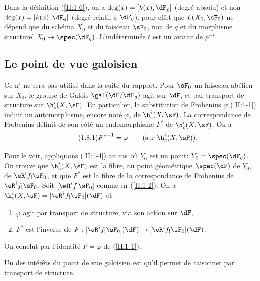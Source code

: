 Dans la définition (\ref{II:1-6}), on a $\deg(x)=[k(x),\dF_p]$ (degré 
absolu) et non $\deg(x)=[k(x),\dF_q]$ (degré relatif à $\dF_q$).  
pour effet que $L(X_0,\sF_0)$ ne dépend que du schéma $X_0$ et du faisceau 
$\sF_0$, non de $q$ et du morphisme structurel $X_0\to\spec(\dF_q)$. 
L'indéterminée $t$ est un avatar de $p^{-s}$. 





\subsection{Le point de vue galoisien}\label{II:1-8}

Ce n$^\circ$ ne sera pas utilisé dans la suite du rapport. Pour $\sF_0$ un 
faisceau abélien sur $X_0$, le groupe de Galois $\gal(\dF/\dF_q)$ agit sur 
$\dF$, et par transport de structure sur $\h_c^i(X,\sF)$. En particulier, la 
substitution de Frobenius $\varphi$ (\ref{II:1-1}) induit un automorphisme, 
encore noté $\varphi$, de $\h_c^i(X,\sF)$. La correspondance de Frobenius 
définit de son côté un endomorphisme $F^*$ de $\h_c^i(X,\sF)$. On a 
\begin{equation*}\tag{1.8.1}\label{II:eq:1-8-1}
  {F^*}^{-1} = \varphi \qquad \text{(sur $\h_c^i(X,\sF)$).}
\end{equation*}

Pour le voir, appliquons (\ref{II:1-4}) au cas où $Y_0$ est un point: 
$Y_0=\spec(\dF_q)$. On trouve que $\h_c^i(X,\sF)$ est la fibre, au point 
géométrique $\spec(\dF)$ de $Y_0$, de $\eR^i f_! \sF_0$, et que $F^*$ est 
la fibre de la correspondance de Frobenius de $\eR^i f_!\sF_0$. Soit 
$[\eR^i f_! \sF_0]$ comme en (\ref{II:1-2}). On a 
$\h_c^i(X,\sF) = [\eR^i f_!\sF_0](\dF)$ et 
\begin{enumerate}[\indent a)]
  \item $\varphi$ agit par transport de structure, via son action sur $\dF$, 
  \item {}$F^*$ est l'inverse de 
    $F:[\eR^i f_!\sF_0](\dF) \to [\eR^i f_!\sF_0](\dF)$. 
\end{enumerate}

On conclut par l'identité $F=\varphi$ de (\ref{II:1-1}). 

Un des intérêts du point de vue galoisien est qu'il permet de raisonner par 
transport de structure. 










